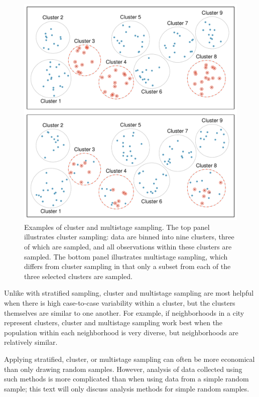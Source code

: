 \begin{figure}
	\centering
	\includegraphics[width=\textwidth]{ch_intro_to_data_oi_biostat/figures/samplingMethodsFigure/cluster_multistage}
	\caption{Examples of cluster and multistage sampling. The top panel illustrates cluster sampling: data are binned into nine clusters, three of which are sampled, and all observations within these clusters are sampled. The bottom panel illustrates multistage sampling, which differs from cluster sampling in that only a subset from each of the three selected clusters are sampled.}
	\label{cluster_multistage}
\end{figure}

Unlike with stratified sampling, cluster and multistage sampling are most helpful when there is high case-to-case variability within a cluster, but the clusters themselves are similar to one another. For example, if neighborhoods in a city represent clusters, cluster and multistage sampling work best when the population within each neighborhood is very diverse, but neighborhoods are relatively similar.

Applying stratified, cluster, or multistage sampling can often be more economical than only drawing random samples. However, analysis of data collected using such methods is more complicated than when using data from a simple random sample; this text will only discuss analysis methods for simple random samples. 


